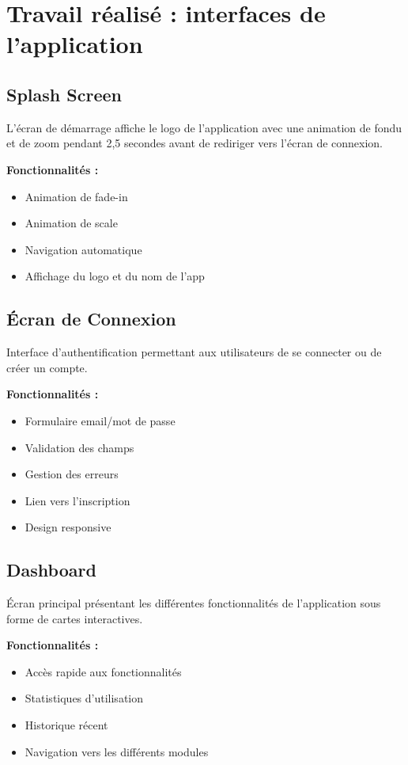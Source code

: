 \documentclass[12pt,a4paper]{report}
\begin{document}
\section{Travail réalisé : interfaces de l'application}

\subsection{Splash Screen}

L'écran de démarrage affiche le logo de l'application avec une animation de fondu et de zoom pendant 2,5 secondes avant de rediriger vers l'écran de connexion.

\textbf{Fonctionnalités :}
\begin{itemize}
    \item Animation de fade-in
    \item Animation de scale
    \item Navigation automatique
    \item Affichage du logo et du nom de l'app
\end{itemize}

\subsection{Écran de Connexion}

Interface d'authentification permettant aux utilisateurs de se connecter ou de créer un compte.

\textbf{Fonctionnalités :}
\begin{itemize}
    \item Formulaire email/mot de passe
    \item Validation des champs
    \item Gestion des erreurs
    \item Lien vers l'inscription
    \item Design responsive
\end{itemize}

\subsection{Dashboard}

Écran principal présentant les différentes fonctionnalités de l'application sous forme de cartes interactives.

\textbf{Fonctionnalités :}
\begin{itemize}
    \item Accès rapide aux fonctionnalités
    \item Statistiques d'utilisation
    \item Historique récent
    \item Navigation vers les différents modules
\end{itemize}
\end{document}
